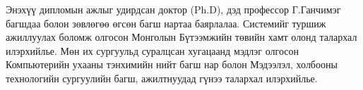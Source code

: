
\begin{acknowledgements}
\addchaptertocentry{\acknowledgementname}
Энэхүү дипломын ажлыг удирдсан доктор (Ph.D), дэд профессор Г.Ганчимэг багшдаа болон зөвлөгөө өгсөн багш нартаа баярлалаа. Системийг туршиж ажиллуулах боломж олгосон Монголын Бүтээмжийн төвийн хамт олонд талархал илэрхийлье. Мөн их сургуульд суралцсан хугацаанд мэдлэг олгосон Компьютерийн ухааны тэнхимийн нийт багш нар болон Мэдээлэл, холбооны технологийн сургуулийн багш, ажилтнуудад гүнээ талархал илэрхийлье.
\end{acknowledgements}
